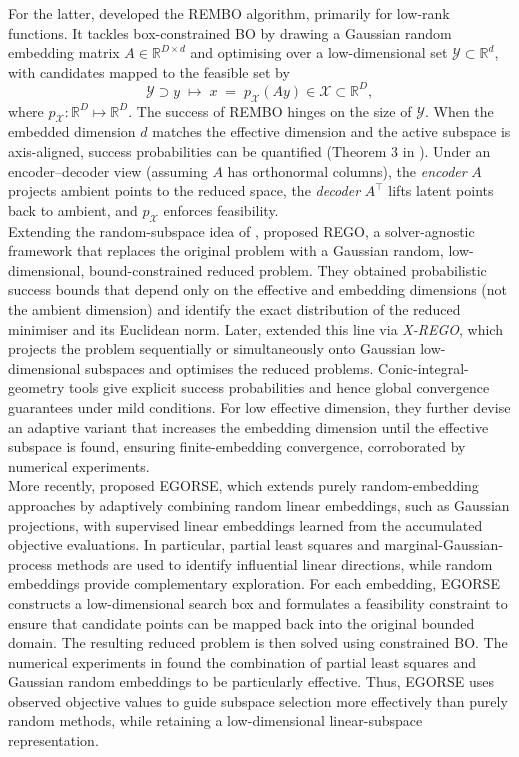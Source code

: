 \documentclass[pdflatex,sn-mathphys-num]{sn-jnl}%
\theoremstyle{thmstyleone}%
\theoremstyle{thmstyletwo}%
\theoremstyle{thmstylethree}%
\begin{document}
For the latter, \citet{Wang2013} developed the REMBO algorithm, primarily for low-rank functions. It tackles box-constrained BO by drawing a Gaussian random embedding matrix \(A\!\in\!\mathbb{R}^{D\times d}\) and optimising over a low-dimensional set \(\mathcal{Y}\subset\mathbb{R}^d\), with candidates mapped to the feasible set by
\[
\mathcal{Y} \supset y \;\mapsto\; x \;=\; p_{\mathcal X}(A y)\in\mathcal X \subset \mathbb{R}^D,
\]
where $p_{\mathcal{X}}: \mathbb{R}^D \mapsto \mathbb{R}^D.$ The success of REMBO hinges on the size of \(\mathcal{Y}\). When the embedded dimension \(d\) matches the effective dimension and the active subspace is axis-aligned, success probabilities can be quantified (Theorem 3 in \cite{Wang2013}). Under an encoder–decoder view (assuming \(A\) has orthonormal columns), the \emph{encoder} $A$ projects ambient points to the reduced space, the \emph{decoder} \(A^\top\) lifts latent points back to ambient, and \( p_{\mathcal X}\) enforces feasibility.\\

Extending the random-subspace idea of \citet{Wang2013}, \citet{cartis2020dimensionalityreductiontechniqueunconstrained} proposed REGO, a solver-agnostic framework that replaces the original problem with a Gaussian random, low-dimensional, bound-constrained reduced problem. They obtained probabilistic success bounds that depend only on the effective and embedding dimensions (not the ambient dimension) and identify the exact distribution of the reduced minimiser and its Euclidean norm. Later, \citet{cartis2021globaloptimizationusingrandom} extended this line via \emph{X-REGO}, which projects the problem sequentially or simultaneously onto Gaussian low-dimensional subspaces and optimises the reduced problems. Conic-integral-geometry tools give explicit success probabilities and hence global convergence guarantees under mild conditions.  For low effective dimension, they further devise an adaptive variant that increases the embedding dimension until the effective subspace is found, ensuring finite-embedding convergence, corroborated by numerical experiments.\\

More recently, \citet{egorse} proposed EGORSE, which extends purely random-embedding approaches by adaptively combining random linear embeddings, such as Gaussian projections, with supervised linear embeddings learned from the accumulated objective evaluations. In particular, partial least squares and marginal-Gaussian-process methods are used to identify influential linear directions, while random embeddings provide complementary exploration. For each embedding, EGORSE constructs a low-dimensional search box and formulates a feasibility constraint to ensure that candidate points can be mapped back into the original bounded domain. The resulting reduced problem is then solved using constrained BO. The numerical experiments in \cite{egorse} found the combination of partial least squares and Gaussian random embeddings to be particularly effective. Thus, EGORSE uses observed objective values to guide subspace selection more effectively than purely random methods, while retaining a low-dimensional linear-subspace representation.\\
\end{document}
